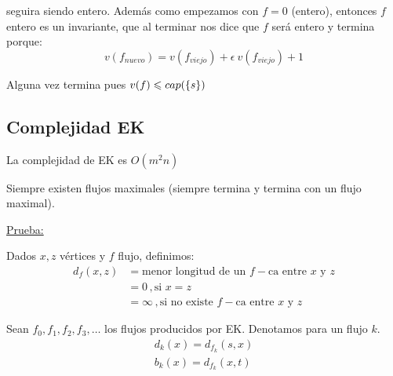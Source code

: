 \documentclass[12pt,a4paper]{article}
\begin{document}
seguira siendo entero. Además como empezamos con $f=0$ (entero), entonces $f$ entero 
es un invariante, que al terminar nos dice que $f$ será entero y termina porque:
$$v(f_{nuevo}) = v(f_{viejo}) + \epsilon \> v(f_{viejo}) + 1$$

Alguna vez termina pues $v(f) \leqslant cap(\left\lbrace s \right\rbrace)$

\subsection{Complejidad EK}
\begin{teorema} La complejidad de EK es $O(m^{2}n)$
    \label{teo:ek}
\end{teorema}

\begin{corolario} Siempre existen flujos maximales (siempre termina y termina con 
    un flujo maximal).
\end{corolario}
\underline{Prueba:}
\medskip

Dados $x,z$ vértices y $f$ flujo, definimos:
\begin{align*}
    d_{f}(x,z) &= \text{menor longitud de un $f-$ca entre $x$ y $z$}\\
    &=0\,, \text{si $x=z$}\\
    &=\infty\,, \text{si no existe $f-$ca entre $x$ y $z$}
\end{align*}

Sean $f_{0},f_{1},f_{2},f_{3},\ldots$ los flujos producidos por EK. Denotamos para 
un flujo $k$.
\begin{align*}
    d_{k}(x) = d_{f_{k}}(s,x)\\
    b_{k}(x) = d_{f_{k}}(x,t)
\end{align*}
\end{document}

